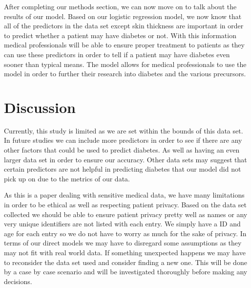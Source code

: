 \documentclass[12pt]{article}
\begin{document}
After completing our methods section, we can now move on to talk about the results of our model. Based on our logistic regression model, we now know that all of the predictors in the data set except skin thickness are important in order to predict whether a patient may have diabetes or not. With this information medical professionals will be able to ensure proper treatment to patients as they can use these predictors in order to tell if a patient may have diabetes even sooner than typical means. The model allows for medical professionals to use the model in order to further their research into diabetes and the various precursors.

\section{Discussion}
\label{sec:disc}

Currently, this study is limited as we are set within the bounds of this data set. In future studies we can include more predictors in order to see if there are any other factors that could be used to predict diabetes. As well as having an even larger data set in order to ensure our accuracy. Other data sets may suggest that certain predictors are not helpful in predicting diabetes that our model did not pick up on due to the metrics of our data. 


As this is a paper dealing with sensitive medical data, we have many limitations in order to be ethical as well as respecting patient privacy. Based on the data set collected we should be able to ensure patient privacy pretty well as names or any very unique identifiers are not listed with each entry. We simply have a ID and age for each entry so we do not have to worry as much for the sake of privacy. In terms of our direct models we may have to disregard some assumptions as they may not fit with real world data. If something unexpected happens we may have to reconsider the data set used and consider finding a new one. This will be done by a case by case scenario and will be investigated thoroughly before making any decisions.



\end{document}
